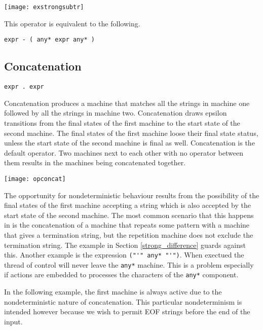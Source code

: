 \documentclass[letterpaper,11pt,oneside]{book}
\newcommand{\verbspace}{\vspace{10pt}}
\newcommand{\graphspace}{\vspace{10pt}}
\begin{document}
\graphspace
\begin{center}
\texttt{[image: exstrongsubtr]}
\end{center}
\graphspace

This operator is equivalent to the following.

\verbspace
\begin{verbatim}
expr - ( any* expr any* )
\end{verbatim}

\subsection{Concatenation}

\verb|expr . expr|
\verbspace

Concatenation produces a machine that matches all the strings in machine one followed by all
the strings in machine two.  Concatenation draws epsilon transitions from the
final states of the first machine to the start state of the second machine. The
final states of the first machine loose their final state status, unless the
start state of the second machine is final as well. 
Concatenation is the default operator. Two machines next to each other with no
operator between them results in the machines being concatenated together.  

\graphspace
\begin{center}
\texttt{[image: opconcat]}
\end{center}
\graphspace

The opportunity for nondeterministic behaviour results from the possibility of
the final states of the first machine accepting a string which is also accepted
by the start state of the second machine.
The most common scenario that this happens in is the
concatenation of a machine that repeats some pattern with a machine that gives
a termination string, but the repetition machine does not exclude the
termination string. The example in Section \ref{strong_difference}
guards against this. Another example is the expression \verb|("'" any* "'")|.
When exectued the thread of control will
never leave the \verb|any*| machine.  This is a problem especially if actions
are embedded to processes the characters of the \verb|any*| component.

In the following example, the first machine is always active due to the
nondeterministic nature of concatenation. This particular nondeterminism is intended
however because we wish to permit EOF strings before the end of the input.
\end{document}
